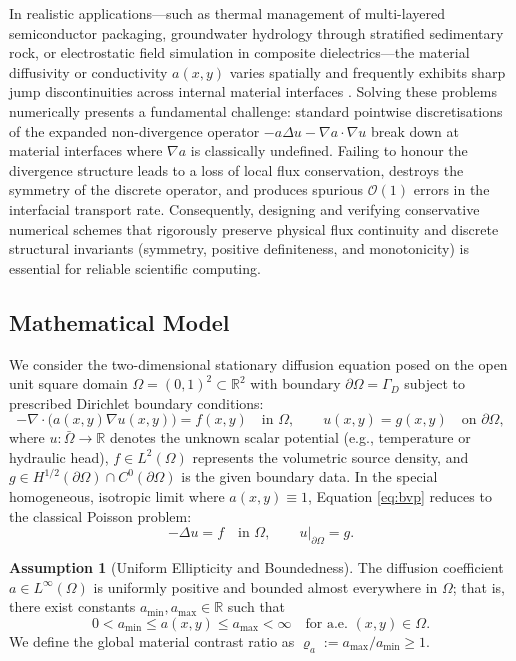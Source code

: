 \documentclass[11pt,a4paper]{article}
\theoremstyle{definition}
\newtheorem{assumption}[theorem]{Assumption}
\theoremstyle{remark}
\begin{document}
In realistic applications---such as thermal management of multi-layered semiconductor packaging, groundwater hydrology through stratified sedimentary rock, or electrostatic field simulation in composite dielectrics---the material diffusivity or conductivity $a(x,y)$ varies spatially and frequently exhibits sharp jump discontinuities across internal material interfaces \cite{quarteroni2017}. Solving these problems numerically presents a fundamental challenge: standard pointwise discretisations of the expanded non-divergence operator $-a\Delta u - \nabla a \cdot \nabla u$ break down at material interfaces where $\nabla a$ is classically undefined. Failing to honour the divergence structure leads to a loss of local flux conservation, destroys the symmetry of the discrete operator, and produces spurious $\mathcal{O}(1)$ errors in the interfacial transport rate. Consequently, designing and verifying conservative numerical schemes that rigorously preserve physical flux continuity and discrete structural invariants (symmetry, positive definiteness, and monotonicity) is essential for reliable scientific computing.

\subsection{Mathematical Model}
We consider the two-dimensional stationary diffusion equation posed on the open unit square domain $\Omega = (0,1)^2 \subset \mathbb{R}^2$ with boundary $\partial\Omega = \Gamma_D$ subject to prescribed Dirichlet boundary conditions:
\begin{equation}
    -\nabla\cdot\bigl(a(x,y)\nabla u(x,y)\bigr) = f(x,y) \quad \text{in } \Omega,
    \qquad
    u(x,y) = g(x,y) \quad \text{on } \partial\Omega,
    \label{eq:bvp}
\end{equation}
where $u: \bar{\Omega} \to \mathbb{R}$ denotes the unknown scalar potential (e.g., temperature or hydraulic head), $f \in L^2(\Omega)$ represents the volumetric source density, and $g \in H^{1/2}(\partial\Omega) \cap C^0(\partial\Omega)$ is the given boundary data. In the special homogeneous, isotropic limit where $a(x,y) \equiv 1$, Equation \eqref{eq:bvp} reduces to the classical Poisson problem:
\begin{equation}
    -\Delta u = f \quad \text{in } \Omega, \qquad u|_{\partial\Omega} = g.
    \label{eq:poisson}
\end{equation}

\begin{assumption}[Uniform Ellipticity and Boundedness]
\label{ass:ellipticity}
The diffusion coefficient $a \in L^\infty(\Omega)$ is uniformly positive and bounded almost everywhere in $\Omega$; that is, there exist constants $a_{\min}, a_{\max} \in \mathbb{R}$ such that
\begin{equation}
    0 < a_{\min} \le a(x,y) \le a_{\max} < \infty \quad \text{for a.e. } (x,y) \in \Omega.
    \label{eq:bounds_a}
\end{equation}
We define the global material contrast ratio as $\varrho_a := a_{\max} / a_{\min} \ge 1$.
\end{assumption}
\end{document}
